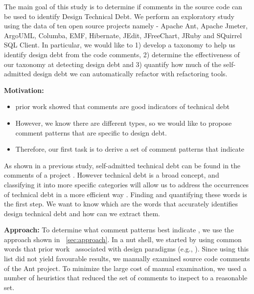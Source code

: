 
The main goal of this study is to determine if comments in the source code can be used to identify  Design Technical Debt. We perform an exploratory study using the data of ten open source projects namely - Apache Ant, Apache Jmeter, ArgoUML, Columba, EMF, Hibernate, JEdit, JFreeChart, JRuby and SQuirrel SQL Client. In particular, we would like to 1) develop a taxonomy to help us identify design debt from the code comments, 2) determine the effectiveness of our taxonomy at detecting design debt and 3) quantify how much of the self-admitted design debt we can automatically refactor with refactoring tools.  

\rqi

\noindent \textbf{Motivation:} 

\begin{itemize}
\item prior work showed that comments are good indicators of technical debt
\item However, we know there are different types, so we would like to propose comment patterns that are specific to design debt.
\item Therefore, our first task is to derive a set of comment patterns that indicate \SADTD
\end{itemize}

As shown in a previous study, self-admitted technical debt can be found in the comments of a project \cite{Potdar2014ICSME}. However  technical debt is a broad concept, and classifying it into more specific categories will allow us to address the occurrences of technical debt in a more efficient way . Finding and quantifying these words is the first step. We want to know which are the words that accurately identifies design technical debt and how can we extract them. 

\noindent \textbf{Approach:} To determine what comment patterns best indicate \SADTD, we use the approach shown in ~\ref{sec:approach}. In a nut shell, we started by using common words that prior work~\cite{fowler1999refactoring, brown1998antipatterns,martin2009clean} associated with design paradigms (e.g., ). Since using this list did not yield favourable results, we manually examined source code comments of the Ant project. To minimize the large cost of manual examination, we used a number of heuristics that reduced the set of comments to inspect to a reasonable set. 

